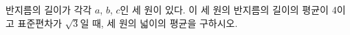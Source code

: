 반지름의 길이가 각각 $a$, $b$, $c$인 세 원이 있다. 이 세 원의 반지름의 길이의 평균이 4이고 표준편차가 $\sqrt{3}$일 때, 세 원의 넓이의 평균을 구하시오.
